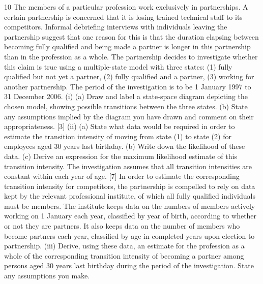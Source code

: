 \documentclass[a4paper,12pt]{article}
\begin{document}
\begin{enumerate}
10
The members of a particular profession work exclusively in partnerships.
A certain partnership is concerned that it is losing trained technical staff to its
competitors. Informal debriefing interviews with individuals leaving the partnership
suggest that one reason for this is that the duration elapsing between becoming fully
qualified and being made a partner is longer in this partnership than in the profession
as a whole.
The partnership decides to investigate whether this claim is true using a multiple-state
model with three states: (1) fully qualified but not yet a partner, (2) fully qualified and
a partner, (3) working for another partnership. The period of the investigation is to
be 1 January 1997 to 31 December 2006.
(i)
(a) Draw and label a state-space diagram depicting the chosen model,
showing possible transitions between the three states.
(b) State any assumptions implied by the diagram you have drawn and
comment on their appropriateness.
[3]
(ii)
(a) State what data would be required in order to estimate the transition
intensity of moving from state (1) to state (2) for employees aged 30
years last birthday.
(b) Write down the likelihood of these data.
(c) Derive an expression for the maximum likelihood estimate of this
transition intensity.
The investigation assumes that all transition intensities are constant within
each year of age.
[7]
In order to estimate the corresponding transition intensity for competitors, the
partnership is compelled to rely on data kept by the relevant professional institute, of
which all fully qualified individuals must be members. The institute keeps data on the
numbers of members actively working on 1 January each year, classified by year of
birth, according to whether or not they are partners. It also keeps data on the number
of members who become partners each year, classified by age in completed years
upon election to partnership.
(iii)
Derive, using these data, an estimate for the profession as a whole of the
corresponding transition intensity of becoming a partner among persons aged
30 years last birthday during the period of the investigation. State any
assumptions you make.


\end{enumerate}
\end{document}
